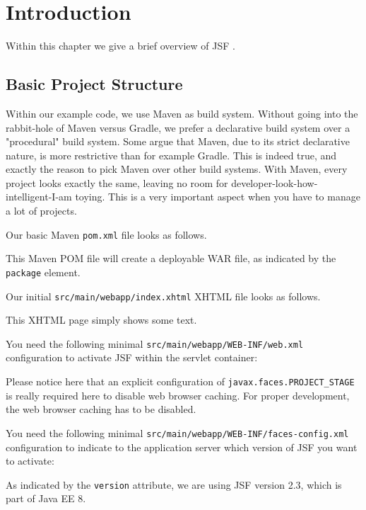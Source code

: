 %

\chapter{Introduction}

Within this chapter we give a brief overview of JSF \cite{JSF23}.

\section{Basic Project Structure}
Within our example code, we use Maven as build system.
Without going into the rabbit-hole of Maven versus Gradle, we prefer a declarative build system over a "procedural" build system.
Some argue that Maven, due to its strict declarative nature, is more restrictive than for example Gradle.
This is indeed true, and exactly the reason to pick Maven over other build systems.
With Maven, every project looks exactly the same, leaving no room for developer-look-how-intelligent-I-am toying.
This is a very important aspect when you have to manage a lot of projects.

Our basic Maven \cite{ApacheMaven} \texttt{pom.xml} file looks as follows.

This Maven POM file will create a deployable WAR file, as indicated by the \texttt{package} element.

Our initial \texttt{src/main/webapp/index.xhtml} XHTML file looks as follows.

This XHTML page simply shows some text.

You need the following minimal \texttt{src/main/webapp/WEB-INF/web.xml} configuration to activate JSF within the servlet container:

Please notice here that an explicit configuration of \texttt{javax.faces.PROJECT\_STAGE} is really required here to disable web browser caching.
For proper development, the web browser caching has to be disabled.

You need the following minimal \texttt{src/main/webapp/WEB-INF/faces-config.xml} configuration to indicate to the application server which version of JSF you want to activate:

As indicated by the \texttt{version} attribute, we are using JSF version 2.3, which is part of Java EE 8.

